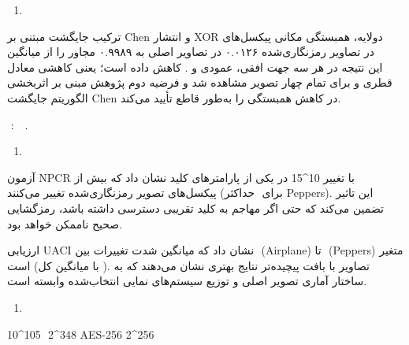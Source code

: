 \begin{enumerate}
\def\labelenumi{\arabic{enumi}.}
\setcounter{enumi}{2}
\item
  \protect{}\label{_Toc232899932}{}   
\end{enumerate}

ترکیب جایگشت مبتنی بر Chen و انتشار XOR دولایه، همبستگی مکانی پیکسل‌های مجاور را از میانگین ‎۰.۹۹۸۹‎ در تصاویر اصلی به ‎۰.۰۱۲۶‎ در تصاویر رمزنگاری‌شده کاهش داده است؛ یعنی کاهشی معادل ‎. این نتیجه در هر سه جهت افقی، عمودی و قطری و برای تمام چهار تصویر مشاهده شد و فرضیه دوم پژوهش مبنی بر اثربخشی الگوریتم جایگشت Chen در کاهش همبستگی را به‌طور قاطع تأیید می‌کند.

       ‌   ‌:               ‌ ‌       ‌.

\begin{enumerate}
\def\labelenumi{\arabic{enumi}.}
\setcounter{enumi}{3}
\item
  \protect{}\label{_Toc232899933}{}   
\end{enumerate}

آزمون NPCR با تغییر 10\^{}15 در یکی از پارامترهای کلید نشان داد که بیش از ‎‎ پیکسل‌های تصویر رمزنگاری‌شده تغییر می‌کنند (حداکثر ‎‎ برای Peppers). این تاثیر تضمین می‌کند که حتی اگر مهاجم به کلید تقریبی دسترسی داشته باشد، رمزگشایی صحیح ناممکن خواهد بود.

ارزیابی UACI نشان داد که میانگین شدت تغییرات بین ‎‎ (Airplane) تا ‎‎ (Peppers) متغیر است (با میانگین کل ‎‎). تصاویر با بافت پیچیده‌تر نتایج بهتری نشان می‌دهند که به ساختار آماری تصویر اصلی و توزیع سیستم‌های نمایی انتخاب‌شده وابسته است.

\begin{enumerate}
\def\labelenumi{\arabic{enumi}.}
\setcounter{enumi}{4}
\item
  \protect{}\label{_Toc232899934}{}        
\end{enumerate}

             10\^{}105  ‌     2\^{}348       AES-256   2\^{}256\RL{)}   ‌        ‌     ‌

